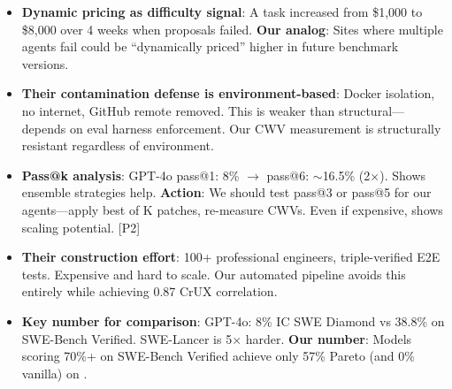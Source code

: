 \begin{itemize}
    \item \textbf{Dynamic pricing as difficulty signal}: A task increased from \$1,000 to \$8,000 over 4 weeks when proposals failed. \textbf{Our analog}: Sites where multiple agents fail could be ``dynamically priced'' higher in future benchmark versions.
    \item \textbf{Their contamination defense is environment-based}: Docker isolation, no internet, GitHub remote removed. This is weaker than structural---depends on eval harness enforcement. Our CWV measurement is structurally resistant regardless of environment.
    \item \textbf{Pass@k analysis}: GPT-4o pass@1: 8\% $\rightarrow$ pass@6: $\sim$16.5\% (2$\times$). Shows ensemble strategies help. \textbf{Action}: We should test pass@3 or pass@5 for our agents---apply best of K patches, re-measure CWVs. Even if expensive, shows scaling potential. [P2]
    \item \textbf{Their construction effort}: 100+ professional engineers, triple-verified E2E tests. Expensive and hard to scale. Our automated pipeline avoids this entirely while achieving 0.87 CrUX correlation.
    \item \textbf{Key number for comparison}: GPT-4o: 8\% IC SWE Diamond vs 38.8\% on SWE-Bench Verified. SWE-Lancer is 5$\times$ harder. \textbf{Our number}: Models scoring 70\%+ on SWE-Bench Verified achieve only 57\% Pareto (and 0\% vanilla) on \OurBench.
\end{itemize}

